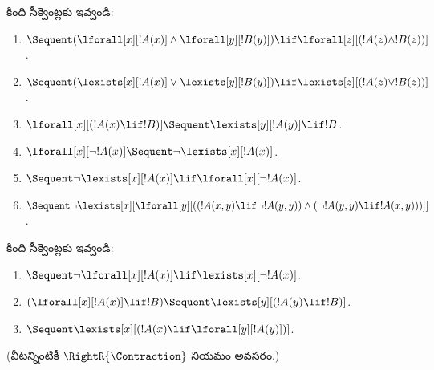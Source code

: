 \documentclass[../../../include/open-logic-section]{subfiles}
\begin{document}
\begin{prob}
కింది సీక్వెంట్లకు  ఇవ్వండి:
\begin{enumerate}
\item $\Sequent (\lforall[x][!A(x)] \land \lforall[y][!B(y)]) \lif
\lforall[z][(!A(z) \land !B(z))]$.
\item $\Sequent (\lexists[x][!A(x)] \lor \lexists[y][!B(y)]) \lif
\lexists[z][(!A(z) \lor !B(z))]$.
\item $\lforall[x][(!A(x) \lif !B)] \Sequent \lexists[y][!A(y)] \lif !B$.
\item $\lforall[x][\lnot !A(x)] \Sequent \lnot\lexists[x][!A(x)]$.
\item $\Sequent \lnot\lexists[x][!A(x)] \lif \lforall[x][\lnot !A(x)]$.
\item $\Sequent \lnot\lexists[x][\lforall[y][((!A(x,y) \lif \lnot
!A(y,y)) \land (\lnot !A(y,y) \lif !A(x,y)))]]$.
\end{enumerate}
\end{prob}

\begin{prob}
కింది సీక్వెంట్లకు  ఇవ్వండి:
\begin{enumerate}
\item $\Sequent \lnot\lforall[x][!A(x)] \lif \lexists[x][\lnot!A(x)]$.
\item $(\lforall[x][!A(x)] \lif !B) \Sequent \lexists[y][(!A(y) \lif !B)]$.
\item $\Sequent \lexists[x][(!A(x) \lif \lforall[y][!A(y)])]$.
\end{enumerate}
(వీటన్నింటికీ $\RightR{\Contraction}$ నియమం అవసరం.)
\end{prob}
\end{document}
